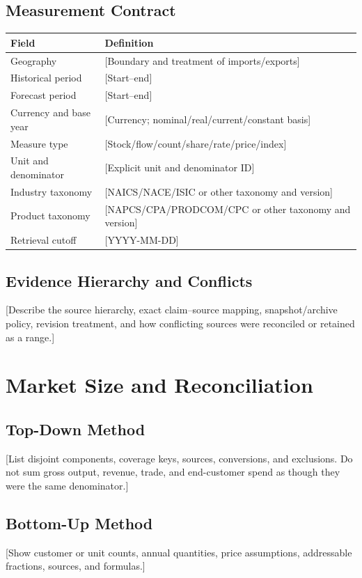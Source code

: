\documentclass[11pt,letterpaper]{report}
\newcommand{\retrievalcutoff}{[YYYY-MM-DD]}
\begin{document}
\section{Measurement Contract}
\begin{longtable}{@{}p{}p{}@{}}
\toprule
Field & Definition \\
\midrule
\endhead
Geography & [Boundary and treatment of imports/exports] \\
Historical period & [Start--end] \\
Forecast period & [Start--end] \\
Currency and base year & [Currency; nominal/real/current/constant basis] \\
Measure type & [Stock/flow/count/share/rate/price/index] \\
Unit and denominator & [Explicit unit and denominator ID] \\
Industry taxonomy & [NAICS/NACE/ISIC or other taxonomy and version] \\
Product taxonomy & [NAPCS/CPA/PRODCOM/CPC or other taxonomy and version] \\
Retrieval cutoff & \retrievalcutoff \\
\bottomrule
\end{longtable}

\section{Evidence Hierarchy and Conflicts}
[Describe the source hierarchy, exact claim--source mapping, snapshot/archive
policy, revision treatment, and how conflicting sources were reconciled or
retained as a range.]

\chapter{Market Size and Reconciliation}

\section{Top-Down Method}
[List disjoint components, coverage keys, sources, conversions, and exclusions.
Do not sum gross output, revenue, trade, and end-customer spend as though they
were the same denominator.]

\section{Bottom-Up Method}
[Show customer or unit counts, annual quantities, price assumptions,
addressable fractions, sources, and formulas.]
\end{document}
